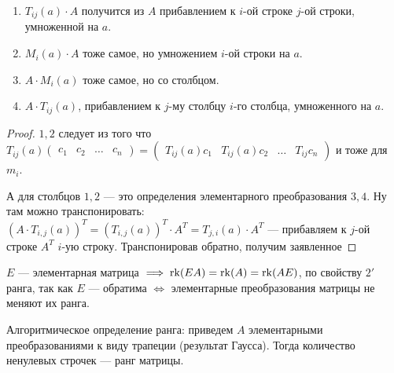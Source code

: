 \begin{statement}
    \begin{enumerate}
        \item $T_{ij}(a) \cdot A$ получится из  $A$ прибавлением к  $i$-ой строке  $j$-ой строки, умноженной на  $a$.
        \item $M_i(a)\cdot A$ тоже самое, но умножением  $i$-ой строки на  $a$.
        \item  $A \cdot M_i(a)$ тоже самое, но со столбцом.
        \item  $A \cdot T_{ij}(a)$, прибавлением к  $j$-му столбцу  $i$-го столбца, умноженного на  $a$.
    \end{enumerate}
\end{statement}
\begin{proof}
    $1, 2$ следует из того что  $T_{ij}(a) \left(\begin{array}{c|c|c|c} c_1 & c_2 & \ldots & c_n \end{array} \right) = \left(\begin{array}{c|c|c|c} T_{ij}(a)c_1 & T_{ij}(a)c_2 & \ldots & T_{ij}c_n \end{array} \right)$ и тоже для $m_i$.

    А для столбцов  $1,2$ --- это определения элементарного преобразования  $3, 4$. Ну там можно транспонировать: $(A \cdot T_{i,j}(a))^T = (T_{i,j}(a))^T \cdot A^T = T_{j,i}(a) \cdot A^T$ --- прибавляем к $j$-ой строке $A^T$ $i$-ую строку. Транспонировав обратно, получим заявленное
\end{proof}
\begin{remark}
    $E$ --- элементарная матрица  $\implies \operatorname{rk}(EA) = \operatorname{rk}(A) = \operatorname{rk}(AE)$, по свойству  $2'$ ранга, так как  $E$ --- обратима  $\iff$ элементарные преобразования матрицы не меняют их ранга.
\end{remark}
\begin{consequence}
    Алгоритмическое определение ранга: приведем $A$ элементарными преобразованиями к виду трапеции (результат Гаусса). Тогда количество ненулевых строчек --- ранг матрицы.
\end{consequence}
